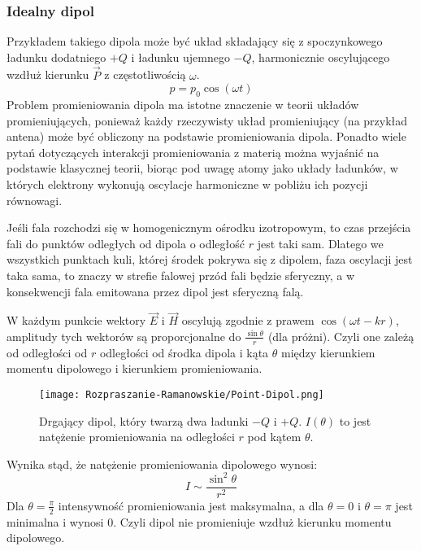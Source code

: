 \subsubsection{Idealny dipol}
Przykładem takiego dipola może być układ składający się z spoczynkowego ładunku dodatniego $+Q$ i ładunku ujemnego $-Q$, harmonicznie oscylującego wzdłuż kierunku $\overrightarrow{P}$ z częstotliwością $\omega$.
\begin{equation}
	p = p_{0}\cos(\omega t)
\end{equation}
Problem promieniowania dipola ma istotne znaczenie w teorii układów promieniujących, ponieważ każdy rzeczywisty układ promieniujący (na przykład antena) może być obliczony na podstawie promieniowania dipola. Ponadto wiele pytań dotyczących interakcji promieniowania z materią można wyjaśnić na podstawie klasycznej teorii, biorąc pod uwagę atomy jako układy ładunków, w których elektrony wykonują oscylacje harmoniczne w pobliżu ich pozycji równowagi.

Jeśli fala rozchodzi się w homogenicznym ośrodku izotropowym, to czas przejścia fali do punktów odległych od dipola o odległość $r$ jest taki sam. Dlatego we wszystkich punktach kuli, której środek pokrywa się z dipolem, faza oscylacji jest taka sama, to znaczy w strefie falowej przód fali będzie sferyczny, a w konsekwencji fala emitowana przez dipol jest sferyczną falą.

W każdym punkcie wektory $\overrightarrow{E}$ i $\overrightarrow{H}$ oscylują zgodnie z prawem $\cos(\omega t - kr)$, amplitudy tych wektorów są proporcjonalne do
$\frac{\sin \theta}{r}$ (dla próżni). Czyli one zależą od odległości od $r$ odległości od środka dipola i kąta $\theta$ między kierunkiem momentu dipolowego i kierunkiem promieniowania.
\begin{figure}[H]
	\begin{center}
		\texttt{[image: Rozpraszanie-Ramanowskie/Point-Dipol.png]}
		\caption{Drgający dipol, który twarzą dwa ładunki $-Q$ i $+Q$. $I(\theta)$ to jest natężenie promieniowania na odległości $r$ pod kątem $\theta$.}
	\end{center}
\end{figure}
Wynika stąd, że natężenie promieniowania dipolowego wynosi:
\begin{equation}
	I \sim \frac{\sin^{2}\theta}{r^{2}}
\end{equation}
Dla $\theta = \frac{\pi}{2}$ intensywność promieniowania jest maksymalna, a dla 
$\theta = 0$ i $\theta = \pi$ jest minimalna i wynosi $0$. Czyli dipol nie promieniuje wzdłuż kierunku momentu dipolowego.
